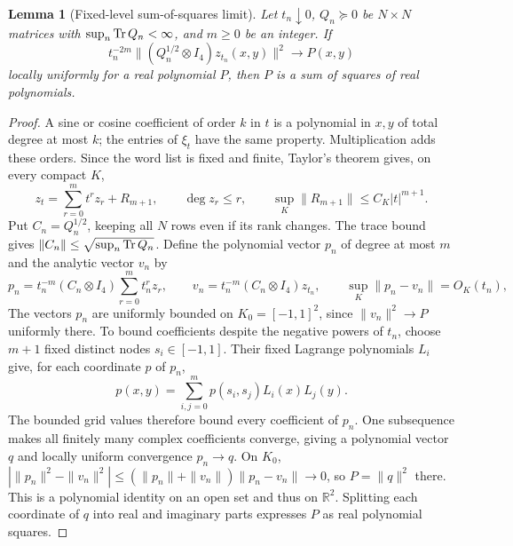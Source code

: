 \documentclass[11pt]{article}
\newtheorem{lemma}[theorem]{Lemma}
\theoremstyle{remark}\newtheorem{remark}[theorem]{Remark}
\newcommand{\R}{\mathbb R}\newcommand{\C}{\mathbb C}
\begin{document}
\begin{lemma}[Fixed-level sum-of-squares limit]
\label{supp:lem:fixed-level-limit}
Let $t_n\downarrow0$, $Q_n\succeq0$ be $N\times N$ matrices with
$\sup_n\operatorname{Tr} Q_n<\infty$, and $m\geq0$ be an integer. If
\begin{equation}
t_n^{-2m}\|(Q_n^{1/2}\otimes I_4)z_{t_n}(x,y)\|^2\longrightarrow P(x,y)
\label{supp:eq:compactness-assumption}
\end{equation}
locally uniformly for a real polynomial $P$, then $P$ is a sum of squares
of real polynomials.
\end{lemma}
\begin{proof}
A sine or cosine coefficient of order $k$ in $t$ is a polynomial in $x,y$
of total degree at most $k$; the entries of $\xi_t$ have the same property. Multiplication
adds these orders. Since the word list is fixed and finite, Taylor's
theorem gives, on every compact $K$,
\begin{equation}
z_t=\sum_{r=0}^m t^rz_r+R_{m+1},\qquad
\deg z_r\leq r,\qquad \sup_K\|R_{m+1}\|\leq C_K|t|^{m+1}.
\label{supp:eq:z-Taylor}
\end{equation}
Put $C_n=Q_n^{1/2}$, keeping all $N$ rows even if its rank changes.
The trace bound gives $\|C_n\|\leq\sqrt{\sup_n\operatorname{Tr} Q_n}$.
Define the polynomial vector $p_n$ of degree at most $m$ and the
analytic vector $v_n$ by
\begin{equation}
p_n=t_n^{-m}(C_n\otimes I_4)\sum_{r=0}^m t_n^rz_r,
\qquad v_n=t_n^{-m}(C_n\otimes I_4)z_{t_n},
\qquad \sup_K\|p_n-v_n\|=O_K(t_n),
\label{supp:eq:pn-definition}
\end{equation}
The vectors $p_n$ are uniformly bounded on $K_0=[-1,1]^2$, since $\|v_n\|^2\to P$
uniformly there. To bound coefficients despite the negative powers of
$t_n$, choose $m+1$ fixed distinct nodes $s_i\in[-1,1]$. Their fixed
Lagrange polynomials $L_i$ give, for each coordinate $p$ of $p_n$,
\[
p(x,y)=\sum_{i,j=0}^m p(s_i,s_j)L_i(x)L_j(y).
\]
The bounded grid values therefore bound every coefficient of $p_n$.
One subsequence makes all finitely many complex coefficients converge,
giving a polynomial vector $q$ and locally uniform convergence $p_n\to q$.
On $K_0$,
$|\|p_n\|^2-\|v_n\|^2|\leq(\|p_n\|+\|v_n\|)\|p_n-v_n\|\to0$,
so $P=\|q\|^2$ there. This is a polynomial identity on an open set and
thus on $\R^2$. Splitting each coordinate of $q$ into real and imaginary
parts expresses $P$ as real polynomial squares.
\end{proof}
\end{document}
